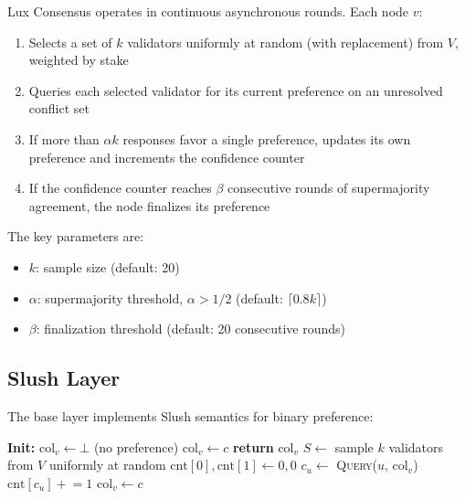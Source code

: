 \documentclass[11pt,a4paper]{article}
\begin{document}
Lux Consensus operates in continuous asynchronous rounds. Each node $v$:
\begin{enumerate}
\item Selects a set of $k$ validators uniformly at random (with replacement) from $V$,
weighted by stake
\item Queries each selected validator for its current preference on an unresolved conflict set
\item If more than $\alpha k$ responses favor a single preference, updates its own preference
and increments the confidence counter
\item If the confidence counter reaches $\beta$ consecutive rounds of supermajority agreement,
the node finalizes its preference
\end{enumerate}

The key parameters are:
\begin{itemize}
\item $k$: sample size (default: 20)
\item $\alpha$: supermajority threshold, $\alpha > 1/2$ (default: $\lceil 0.8k \rceil$)
\item $\beta$: finalization threshold (default: 20 consecutive rounds)
\end{itemize}

\subsection{Slush Layer}

The base layer implements Slush semantics for binary preference:

\begin{algorithm}
\caption{Slush: Binary Preference Gossip}
\label{alg:slush}
\begin{algorithmic}[1]
\State \textbf{Init:} $\text{col}_v \leftarrow \bot$ (no preference)
        \State $\text{col}_v \leftarrow c$
    \EndIf
    \State \textbf{return} $\text{col}_v$
\EndProcedure
{}
        \State $S \leftarrow$ sample $k$ validators from $V$ uniformly at random
        \State $\text{cnt}[0], \text{cnt}[1] \leftarrow 0, 0$
            \State $c_u \leftarrow$ \textsc{Query}($u$, $\text{col}_v$)
            \State $\text{cnt}[c_u] \mathrel{+}= 1$
        \EndFor
            \State $\text{col}_v \leftarrow c$
        \EndIf
    \EndWhile
\EndProcedure
\end{algorithmic}
\end{algorithm}
\end{document}
